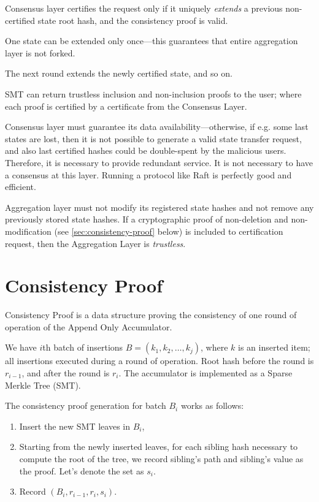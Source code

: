 \documentclass{llncs}
\begin{document}
Consensus layer certifies the request only if it uniquely \textit{extends} a previous non-certified state root hash, and the consistency proof is valid.

One state can be extended only once---this guarantees that entire aggregation layer is not forked.

The next round extends the newly certified state, and so on.

SMT can return trustless inclusion and non-inclusion proofs to the user; where each proof is certified by a certificate from the Consensus Layer.

Consensus layer must guarantee its data availability---otherwise, if e.g. some last states are lost, then it is not possible to generate a valid state transfer request, and also last certified hashes could be double-spent by the malicious users. Therefore, it is necessary to provide redundant service. It is not necessary to have a consensus at this layer. Running a protocol like Raft is perfectly good and efficient.

Aggregation layer must not modify its registered state hashes and not remove any previously stored state hashes. If a cryptographic proof of non-deletion and non-modification (see \ref{sec:consistency-proof} below) is included to certification request, then the Aggregation Layer is \emph{trustless}.


\section{Consistency Proof}

Consistency Proof is a data structure proving the consistency of one round of operation of the Append Only Accumulator.

We have $i$th batch of insertions $B = (k_1, k_2, \dots, k_j)$, where $k$ is an inserted item; all insertions executed during a round of operation. Root hash before the round is $r_{i-1}$, and after the round is $r_i$. The accumulator is implemented as a Sparse Merkle Tree (SMT).

The consistency proof generation for batch $B_i$ works as follows:

\begin{enumerate}
    \item Insert the new SMT leaves in $B_i$,
    \item Starting from the newly inserted leaves, for each sibling hash necessary to compute the root of the tree, we record sibling's path and sibling's value as the proof. Let's denote the set as $s_i$.
    \item Record $(B_i, r_{i-1}, r_i, s_i)$.
\end{enumerate}
\end{document}

